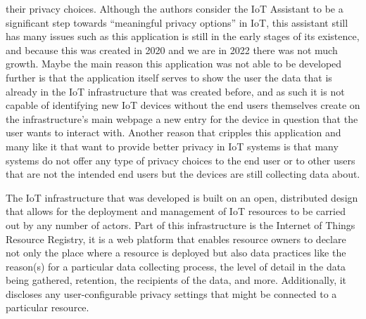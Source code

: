\documentclass[conference]{IEEEtran}
\begin{document}
their privacy choices. Although the authors consider the IoT Assistant to
be a significant step towards ``meaningful privacy options'' in IoT, this
assistant still has many issues such as this application is still in the
early stages of its existence, and because this was created in 2020 and
we are in 2022 there was not much growth. Maybe the main reason this application
was not able to be developed further is that the application itself serves
to show the user the data that is already in the IoT infrastructure that was
created before, and as such it is not capable of identifying new IoT devices
without the end users themselves create on the infrastructure's main webpage \cite{DasPersonalized}
a new entry for the device in question that the user wants to interact with.
Another reason that cripples this application and many like it that want to
provide better privacy in IoT systems is that many systems do not offer any
type of privacy choices to the end user or to other users that are not the
intended end users but the devices are still collecting data about.

The IoT infrastructure that was developed \cite{DasPersonalized} is built
on an open, distributed design that allows for the deployment and management
of IoT resources to be carried out by any number of actors. Part of this
infrastructure is the Internet of Things Resource Registry, it is a web platform
that enables resource owners to declare not only the place where a resource
is deployed but also data practices like the reason(s) for a particular data
collecting process, the level of detail in the data being gathered, retention,
the recipients of the data, and more. Additionally, it discloses any user-configurable
privacy settings that might be connected to a particular resource.



\end{document}
